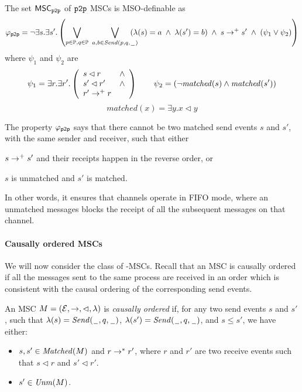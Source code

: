 The set $\mathsf{MSC}_{\mathtt{p2p}}$ of $\mathtt{p2p}$ MSCs is MSO-definable as
	\[
		\varphi_{\mathsf{p2p}} = \neg \exists s.\exists s'. \left(
		\bigvee_{\substack{p \in \mathbb{P}, q \in \mathbb{P}}}\;
		\bigvee_{\substack{a,b \in {\mathit{Send}(p,q,\hspace{0.1em}\underline{\hspace{0.5em}}\hspace{0.1em})}}}\hspace{-1em}
		(\lambda(s) = a \;\wedge\; \lambda(s') = b) \;\wedge\; s \to^+ s' \;\wedge\;
		(\psi_1 \vee \psi_2 ) 	
		\right)
	\]
	where $\psi_1$ and $\psi_2$ are
	\[
		\psi_1 = \exists r.\exists r'.\left(
		\begin{array}{ll}
			s \lhd r & \wedge\\
			s' \lhd r' & \wedge\\
			r' \to^+ r &
		\end{array} 
		\right) \quad \quad
		\psi_2 = (\neg \mathit{matched}(s) \wedge \mathit{matched}(s'))
		\]
		\[
		matched(x) = \exists y. x \lhd y
	\]

The property $\varphi_{\mathsf{p2p}}$ says that there cannot be two matched send events $s$ and $s'$, with the same sender and receiver, such that either
\begin{enumerate*}[label={(\roman*)}]
	\item $s \to^+ s'$ and their receipts happen in the reverse order, or
	\item $s$ is unmatched and $s'$ is matched.
\end{enumerate*}
In other words, it ensures that channels operate in FIFO mode, where an unmatched messages blocks the receipt of all the subsequent messages on that channel.


\paragraph{\bf Causally ordered MSCs}
We will now consider the class of \co-MSCs. Recall that an MSC is causally ordered if all the messages sent to the same process are received in an order which is consistent with the causal ordering of the corresponding send events. 

\begin{definition}[\co-MSC]\label{def:co_msc}
An MSC $M = (\mathcal{E},\to,\lhd,\lambda)$ is \emph{causally ordered} if, for any two send events $s$ and $s'$, such that $\lambda(s)={\mathit{Send}(\hspace{0.1em}\underline{\hspace{0.5em}}\hspace{0.1em},q,\hspace{0.1em}\underline{\hspace{0.5em}}\hspace{0.1em})}$, $\lambda(s')={\mathit{Send}(\hspace{0.1em}\underline{\hspace{0.5em}}\hspace{0.1em},q,\hspace{0.1em}\underline{\hspace{0.5em}}\hspace{0.1em})}$, and $s \le s'$, we have either:
\begin{itemize}%
	\item $s,s' \in \mathit{Matched}(M)$ and $r \to^* r'$, where $r$ and $r'$ are two receive events such that $s \lhd r$ and $s' \lhd r'$.
	\item $s' \in \mathit{Unm}(M)$.
\end{itemize}
\end{definition}

